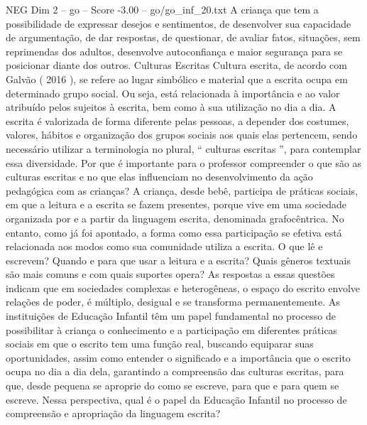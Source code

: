 \begin{textsample}{NEG Dim 2 – go – Score -3.00 – go/go\_inf\_20.txt}
A criança que tem a possibilidade de expressar desejos e sentimentos, de desenvolver sua capacidade de argumentação, de dar respostas, de questionar, de avaliar fatos, situações, sem reprimendas dos adultos, desenvolve autoconfiança e maior segurança para se posicionar diante dos outros.
Culturas Escritas Cultura escrita, de acordo com Galvão ( 2016 ), se refere ao lugar simbólico e material que a escrita ocupa em determinado grupo social.
Ou seja, está relacionada à importância e ao valor atribuído pelos sujeitos à escrita, bem como à sua utilização no dia a dia.
A escrita é valorizada de forma diferente pelas pessoas, a depender dos costumes, valores, hábitos e organização dos grupos sociais aos quais elas pertencem, sendo necessário utilizar a terminologia no plural, “ culturas escritas ”, para contemplar essa diversidade.
Por que é importante para o professor compreender o que são as culturas escritas e no que elas influenciam no desenvolvimento da ação pedagógica com as crianças?
A criança, desde bebê, participa de práticas sociais, em que a leitura e a escrita se fazem presentes, porque vive em uma sociedade organizada por e a partir da linguagem escrita, denominada grafocêntrica.
No entanto, como já foi apontado, a forma como essa participação se efetiva está relacionada aos modos como sua comunidade utiliza a escrita.
O que lê e escrevem?
Quando e para que usar a leitura e a escrita?
Quais gêneros textuais são mais comuns e com quais suportes opera?
As respostas a essas questões indicam que em sociedades complexas e heterogêneas, o espaço do escrito envolve relações de poder, é múltiplo, desigual e se transforma permanentemente.
As instituições de Educação Infantil têm um papel fundamental no processo de possibilitar à criança o conhecimento e a participação em diferentes práticas sociais em que o escrito tem uma função real, buscando equiparar suas oportunidades, assim como entender o significado e a importância que o escrito ocupa no dia a dia dela, garantindo a compreensão das culturas escritas, para que, desde pequena se aproprie do como se escreve, para que e para quem se escreve.
Nessa perspectiva, qual é o papel da Educação Infantil no processo de compreensão e apropriação da linguagem escrita?

\end{textsample}
